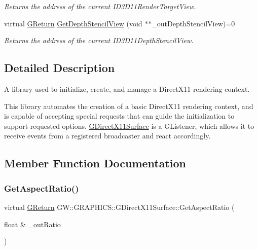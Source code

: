 \begin{DoxyCompactItemize}
\begin{DoxyCompactList}\small\item\em Returns the address of the current I\+D3\+D11\+Render\+Target\+View. \end{DoxyCompactList}\item 
virtual \mbox{\hyperlink{namespace_g_w_a67a839e3df7ea8a5c5686613a7a3de21}{G\+Return}} \mbox{\hyperlink{class_g_w_1_1_g_r_a_p_h_i_c_s_1_1_g_direct_x11_surface_a44937f7b6e85b0b8df3ac6871c4b87a3}{Get\+Depth\+Stencil\+View}} (void $\ast$$\ast$\+\_\+out\+Depth\+Stencil\+View)=0
\begin{DoxyCompactList}\small\item\em Returns the address of the current I\+D3\+D11\+Depth\+Stencil\+View. \end{DoxyCompactList}\end{DoxyCompactItemize}


\subsection{Detailed Description}
A library used to initialize, create, and manage a Direct\+X11 rendering context. 

This library automates the creation of a basic Direct\+X11 rendering context, and is capable of accepting special requests that can guide the initialization to support requested options. \mbox{\hyperlink{class_g_w_1_1_g_r_a_p_h_i_c_s_1_1_g_direct_x11_surface}{G\+Direct\+X11\+Surface}} is a G\+Listener, which allows it to receive events from a registered broadcaster and react accordingly. 

\subsection{Member Function Documentation}
\mbox{\label{class_g_w_1_1_g_r_a_p_h_i_c_s_1_1_g_direct_x11_surface_a4ae8372993803025a14a8471835ed231}} 
\subsubsection{\texorpdfstring{Get\+Aspect\+Ratio()}{GetAspectRatio()}}
{\footnotesize\ttfamily virtual \mbox{\hyperlink{namespace_g_w_a67a839e3df7ea8a5c5686613a7a3de21}{G\+Return}} G\+W\+::\+G\+R\+A\+P\+H\+I\+C\+S\+::\+G\+Direct\+X11\+Surface\+::\+Get\+Aspect\+Ratio (\begin{DoxyParamCaption}\item[{float \&}]{\+\_\+out\+Ratio }\end{DoxyParamCaption})\hspace{0.3cm}{\ttfamily [pure virtual]}}



